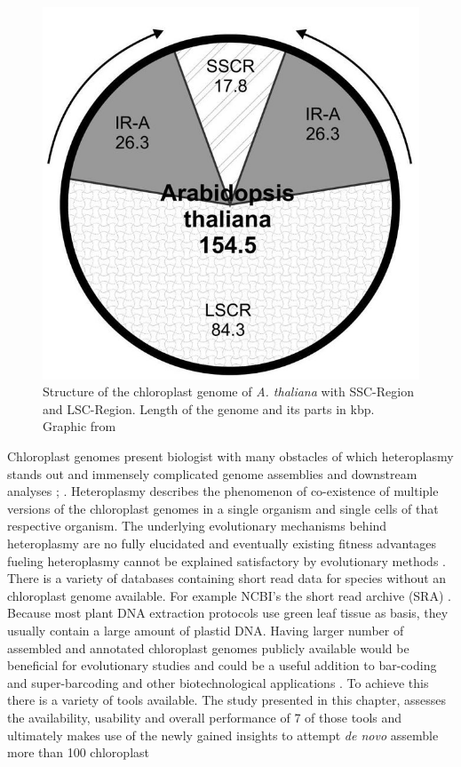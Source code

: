 \begin{figure}[H]
\centering
\includegraphics[height=.55\textheight, width=.95\textwidth]{Figures/cpast}
\decoRule
\caption[Structure of a chloroplast genome]{Structure of the chloroplast genome of \textit{A. thaliana} with SSC-Region and LSC-Region. Length of the genome and its parts in kbp. Graphic from \cite{olejniczak2016chloroplasts}}
\label{fig:cpast_genome}
\end{figure}

Chloroplast genomes present biologist with many obstacles of which heteroplasmy stands out and immensely
complicated genome assemblies and downstream analyses \cite{corriveau_1988}; \cite{Chat2002}.  Heteroplasmy
describes the phenomenon of co-existence of multiple versions of the chloroplast genomes in a single organism
and single cells of that respective organism. The underlying evolutionary mechanisms behind heteroplasmy are
no fully elucidated and eventually existing fitness advantages fueling heteroplasmy cannot be explained
satisfactory by evolutionary methods \cite{Scar2016}.  There is a variety of databases containing short read
data for species without an chloroplast genome available. For example NCBI's the short read archive (SRA)
\cite{SRA2010}. Because most plant DNA extraction protocols use green leaf tissue as basis, they usually
contain a large amount of plastid DNA. Having larger number of assembled and annotated chloroplast genomes
publicly available would be beneficial for evolutionary studies and could be a useful addition to bar-coding
and super-barcoding \cite{coissac_barcodes_2016} and other biotechnological applications
\cite{daniell_chloroplast_2016}. To achieve this there is a variety of tools available. The study presented in
this chapter, assesses the availability, usability and overall performance of 7 of those tools and ultimately
makes use of the newly gained insights to attempt \textit{de novo} assemble more than 100 chloroplast




